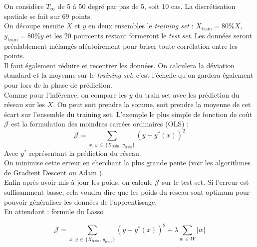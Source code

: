 \documentclass[a4paper,12pt]{article}
\newcommand{\bepar}[1]{
	\left( #1 \right)  
}
\newcommand{\J}{\mathcal{J}}
\newcommand{\tinf}{$T_\infty$}
\numberwithin{equation}{section} %
\begin{document}
\noindent On considère \tinf $ $ de 5 à 50 degré par pas de 5, soit 10 cas. La discrétisation spatiale se fait sur 69 points.\\
On découpe ensuite $X$ et $y$ en deux ensembles le \textit{training set} : $X_{\text{train}} = 80\% X$, $y_{\text{train}}= 80\% y$ et les 20 pourcents restant formeront le \textit{test set}. Les données seront préalablement mélangés aléatoirement pour briser toute corrélation entre les points.\\
Il faut également réduire et recentrer les données. On calculera la déviation standard et la moyenne sur le \textit{training set}; c'est l'échelle qu'on gardera également pour lors de la phase de prédiction.\\
Comme pour l'inférence, on compare les $y$ du train set avec les prédiction du réseau sur les $X$. On peut soit prendre la somme, soit prendre la moyenne de cet écart sur l'ensemble du training set. L'exemple le plus simple de fonction de coût $\J$ est la formulation des moindres carrées ordinaires (OLS)  :
\begin{equation}
\J = \sum_{x, \, y\, \in\, \{X_{\text{train}},\, y_{\text{train}}\}} \bepar{y - y^*\bepar{x}}^2 \tag{OLS} \label{JOLS}
\end{equation}
Avec $y^*$ représentant la prédiction du réseau. \\
On minimise cette erreur en cherchant la plus grande pente (voir les algorithmes de Gradient Descent \citep{Goodfellow-et-al-2016} ou Adam \citep{kingma2014adam}).\\
Enfin après avoir mis à jour les poids, on calcule $\J$ sur le test set. Si l'erreur est suffisamment basse, cela voudra dire que les poids du réseau sont optimum pour pouvoir généraliser les données de l'apprentissage.\\

En attendant  : formule du Lasso 

\begin{equation}
\J = \sum_{x, \, y\, \in\, \{X_{\text{train}},\, y_{\text{train}}\}} \bepar{y - y^*\bepar{x}}^2 + \lambda \sum_{w\, \in\, W} |w| \tag{OLS} \label{JOLS}
\end{equation}
\noindent 
\end{document}
